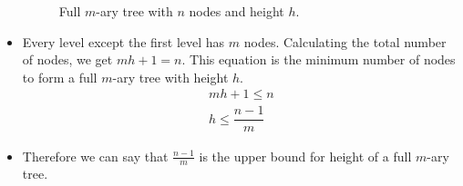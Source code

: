 \documentclass[12pt]{article}
\begin{document}
\begin{itemize}
\begin{figure}[H]
		\caption{Full $m$-ary tree with $n$ nodes and height $h$.}
	\end{figure}
	\item Every level except the first level has $m$ nodes. Calculating the total number of nodes, we get $mh+1=n$. This equation is the minimum number of nodes to form a full $m$-ary tree with height $h$.
	\begin{equation*}
		\begin{split}
			mh + 1 \leq n \\
			h \leq \dfrac{n-1}{m}
		\end{split}
	\end{equation*}
	\item Therefore we can say that $\frac{n-1}{m}$ is the upper bound for height of a full $m$-ary tree.
\end{itemize}
\end{document}
